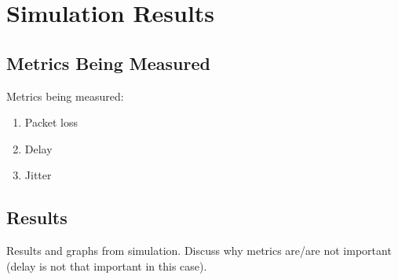 \chapter{Simulation Results} 

\section{Metrics Being Measured}

Metrics being measured: 

\begin{enumerate}
\item Packet loss
\item Delay
\item Jitter
\end{enumerate}

\section{Results}

Results and graphs from simulation.
Discuss why metrics are/are not important (delay is not that important in this case).